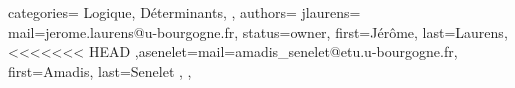 {
  categories={
    Logique,
    Déterminants,
  },
  authors={
    jlaurens={
      mail=jerome.laurens@u-bourgogne.fr,
      status=owner,
      first=Jérôme,
      last=Laurens,
<<<<<<< HEAD
    },asenelet={mail=amadis_senelet@etu.u-bourgogne.fr, 
      first=Amadis,
      last=Senelet
   },
 }, 
 
}
